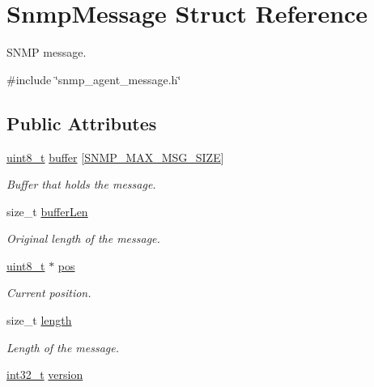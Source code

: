 \hypertarget{structSnmpMessage}{}\section{Snmp\+Message Struct Reference}
\label{structSnmpMessage}


S\+N\+MP message.  




{\ttfamily \#include \char`\"{}snmp\+\_\+agent\+\_\+message.\+h\char`\"{}}

\subsection*{Public Attributes}
\begin{DoxyCompactItemize}
\item 
\hyperlink{stdint_8h_aba7bc1797add20fe3efdf37ced1182c5}{uint8\+\_\+t} \hyperlink{structSnmpMessage_a60405510f10de109ac78bf7ae8427f24}{buffer} \mbox{[}\hyperlink{snmp__common_8h_af5a22cbaa4973c106e664d5d01316fae}{S\+N\+M\+P\+\_\+\+M\+A\+X\+\_\+\+M\+S\+G\+\_\+\+S\+I\+ZE}\mbox{]}
\begin{DoxyCompactList}\small\item\em Buffer that holds the message. \end{DoxyCompactList}\item 
size\+\_\+t \hyperlink{structSnmpMessage_a02cd31ab221cd718f39cf8621f98c0b6}{buffer\+Len}
\begin{DoxyCompactList}\small\item\em Original length of the message. \end{DoxyCompactList}\item 
\hyperlink{stdint_8h_aba7bc1797add20fe3efdf37ced1182c5}{uint8\+\_\+t} $\ast$ \hyperlink{structSnmpMessage_a37d25fb4329d91746ae12b8f1ddb612b}{pos}
\begin{DoxyCompactList}\small\item\em Current position. \end{DoxyCompactList}\item 
size\+\_\+t \hyperlink{structSnmpMessage_a93c0a098352c158e9dba13bbd023e0fd}{length}
\begin{DoxyCompactList}\small\item\em Length of the message. \end{DoxyCompactList}\item 
\hyperlink{stdint_8h_ab1967d8591af1a4e48c37fd2b0f184d0}{int32\+\_\+t} \hyperlink{structSnmpMessage_a38b300782f7395005708f45f26dae7c1}{version}

\end{DoxyCompactItemize}
